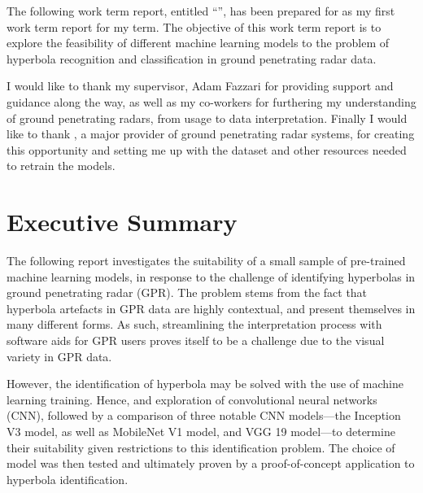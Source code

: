 \documentclass[se,blockletter]{uw-wkrpt}
\begin{document}
\newcommand{\thecompany}{Sensors \& Software Inc.}

\frontmatter

\begin{letter}

The following work term report, entitled ``\thetitle'', has been prepared for \theemployer{} as my first work term report for my \theterm{} term. The objective of this work term report is to explore the feasibility of different machine learning models to the problem of hyperbola recognition and classification in ground penetrating radar data. 

I would like to thank my supervisor, Adam Fazzari for providing support and guidance along the way, as well as my co-workers for furthering my understanding of ground penetrating radars, from usage to data interpretation. Finally I would like to thank \theemployer{}, a major provider of ground penetrating radar systems, for creating this opportunity and setting me up with the dataset and other resources needed to retrain the models. 

\end{letter}

\section{Executive Summary}
The following report investigates the suitability of a small sample of pre-trained machine learning models, in response to the challenge of identifying hyperbolas in ground penetrating radar (GPR). The problem stems from the fact that hyperbola artefacts in GPR data are highly contextual, and present themselves in many different forms. As such, streamlining the interpretation process with software aids for GPR users proves itself to be a challenge due to the visual variety in GPR data.

However, the identification of hyperbola may be solved with the use of machine learning training. Hence, and exploration of convolutional neural networks (CNN), followed by a comparison of three notable CNN models---the Inception V3 model, as well as MobileNet V1 model, and VGG 19 model---to determine their suitability given restrictions to this identification problem. The choice of model was then tested and ultimately proven by a proof-of-concept application to hyperbola identification.
\end{document}
